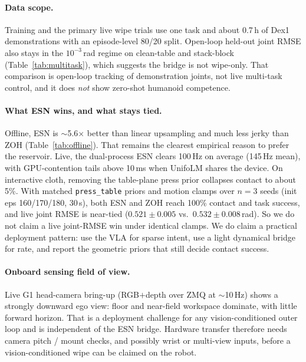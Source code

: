 \documentclass{article}
\begin{document}
\paragraph{Data scope.}
Training and the primary live wipe trials use one task and about 0.7\,h of Dex1 demonstrations with an episode-level 80/20 split.
Open-loop held-out joint RMSE also stays in the $10^{-3}$\,rad regime on clean-table and stack-block (Table~\ref{tab:multitask}), which suggests the bridge is not wipe-only.
That comparison is open-loop tracking of demonstration joints, not live multi-task control, and it does \emph{not} show zero-shot humanoid competence.

\paragraph{What ESN wins, and what stays tied.}
Offline, ESN is $\sim$5.6$\times$ better than linear upsampling and much less jerky than ZOH (Table~\ref{tab:offline}).
That remains the clearest empirical reason to prefer the reservoir.
Live, the dual-process ESN clears 100\,Hz on average (145\,Hz mean), with GPU-contention tails above 10\,ms when UnifoLM shares the device.
On interactive cloth, removing the table-plane press prior collapses contact to about 5\%.
With matched \texttt{press\_table} priors and motion clamps over $n{=}3$ seeds (init eps 160/170/180, 30\,s), both ESN and ZOH reach 100\% contact and task success, and live joint RMSE is near-tied ($0.521\!\pm\!0.005$ vs.\ $0.532\!\pm\!0.008$\,rad).
So we do not claim a live joint-RMSE win under identical clamps.
We do claim a practical deployment pattern: use the VLA for sparse intent, use a light dynamical bridge for rate, and report the geometric priors that still decide contact success.

\paragraph{Onboard sensing field of view.}
Live G1 head-camera bring-up (RGB$+$depth over ZMQ at $\sim$10\,Hz) shows a strongly downward ego view: floor and near-field workspace dominate, with little forward horizon.
That is a deployment challenge for any vision-conditioned outer loop and is independent of the ESN bridge.
Hardware transfer therefore needs camera pitch / mount checks, and possibly wrist or multi-view inputs, before a vision-conditioned wipe can be claimed on the robot.
\end{document}
